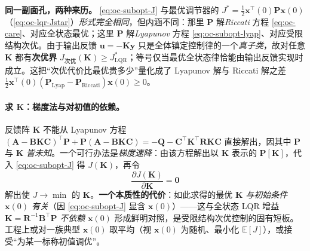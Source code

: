 \begin{insight}
\textbf{同一副面孔，两种来历。}\; \cref{eq:oc-subopt-J} 与最优调节器的 $J^*=\tfrac12\mathbf x^\top(0)\mathbf P\mathbf x(0)$（\cref{eq:oc-lqr-Jstar}）\emph{形式完全相同}，但内涵不同：那里 $\mathbf P$ 解\emph{Riccati} 方程 \cref{eq:oc-care}、对应全状态最优；这里 $\mathbf P$ 解\emph{Lyapunov} 方程 \cref{eq:oc-subopt-lyap}、对应受限结构次优。由于输出反馈 $\mathbf u=-\mathbf K\mathbf y$ 只是全体镇定控制律的一个\emph{真子类}，故对任意 $\mathbf K$ 都有\textbf{次优界} $J_{\text{次优}}(\mathbf K)\ge J^*_{\text{LQR}}$；等号仅当最优全状态律恰能由输出反馈实现时成立。这把“次优代价比最优贵多少”量化成了 Lyapunov 解与 Riccati 解之差 $\tfrac12\mathbf x^\top(0)(\mathbf P_{\text{Lyap}}-\mathbf P_{\text{Riccati}})\mathbf x(0)\ge0$。
\end{insight}

\paragraph{求 $\mathbf K$：梯度法与对初值的依赖。}
反馈阵 $\mathbf K$ 不能从 Lyapunov 方程 $(\mathbf A-\mathbf B\mathbf K\mathbf C)^\top\mathbf P+\mathbf P(\mathbf A-\mathbf B\mathbf K\mathbf C)=-\mathbf Q-\mathbf C^\top\mathbf K^\top\mathbf R\mathbf K\mathbf C$ 直接解出，因其中 $\mathbf P$ 与 $\mathbf K$ \emph{皆未知}。一个可行办法是\emph{梯度速降}：由该方程解出以 $\mathbf K$ 表示的 $\mathbf P[\mathbf K]$，代入 \cref{eq:oc-subopt-J} 得 $J(\mathbf K)$，再令
\begin{equation}
  \frac{\partial J(\mathbf K)}{\partial\mathbf K}=\mathbf0
  \label{eq:oc-subopt-grad}
\end{equation}
解出使 $J\to\min$ 的 $\mathbf K$。\textbf{一个本质性的代价}：如此求得的最优 $\mathbf K$ \emph{与初始条件 $\mathbf x(0)$ 有关}（因 \cref{eq:oc-subopt-J} 显含 $\mathbf x(0)$）——这与全状态 LQR 增益 $\mathbf K=\mathbf R^{-1}\mathbf B^\top\mathbf P$ \emph{不依赖} $\mathbf x(0)$ 形成鲜明对照，是受限结构次优控制的固有短板。工程上或对一族典型 $\mathbf x(0)$ 取平均（视 $\mathbf x(0)$ 为随机、最小化 $\mathbb E[J]$），或接受“为某一标称初值调优”。

